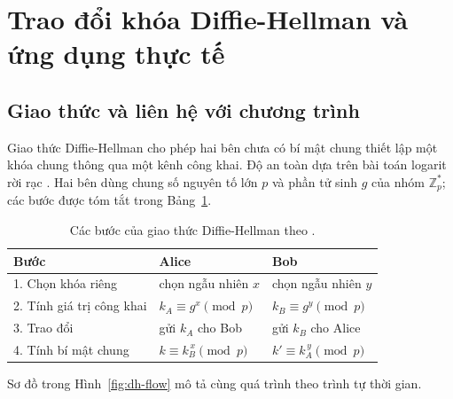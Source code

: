 
\section{Trao đổi khóa Diffie-Hellman và ứng dụng thực tế}
\label{sec:dh-ungdung}

\subsection{Giao thức và liên hệ với chương trình}

Giao thức Diffie-Hellman \cite{diffie1976new} cho phép hai bên chưa có bí mật chung
thiết lập một khóa chung thông qua một kênh công khai. Độ an toàn dựa trên bài
toán logarit rời rạc \cite{slide-bai2}. Hai bên dùng chung số nguyên tố lớn $p$
và phần tử sinh $g$ của nhóm $\mathbb{Z}_p^*$; các bước được tóm tắt trong
Bảng~\ref{tab:dh-steps}.

\begin{table}[!htbp]
\centering
\begin{tabular}{@{}lll@{}}
\toprule
Bước & Alice & Bob \\
\midrule
1. Chọn khóa riêng & chọn ngẫu nhiên $x$ & chọn ngẫu nhiên $y$ \\
2. Tính giá trị công khai & $k_A \equiv g^x \pmod p$ & $k_B \equiv g^y \pmod p$ \\
3. Trao đổi & gửi $k_A$ cho Bob & gửi $k_B$ cho Alice \\
4. Tính bí mật chung & $k \equiv k_B^{\,x} \pmod p$ & $k' \equiv k_A^{\,y} \pmod p$ \\
\bottomrule
\end{tabular}
\caption{Các bước của giao thức Diffie-Hellman theo \cite{slide-bai2}.}
\label{tab:dh-steps}
\end{table}

Sơ đồ trong Hình~\ref{fig:dh-flow} mô tả cùng quá trình theo trình tự thời gian.

